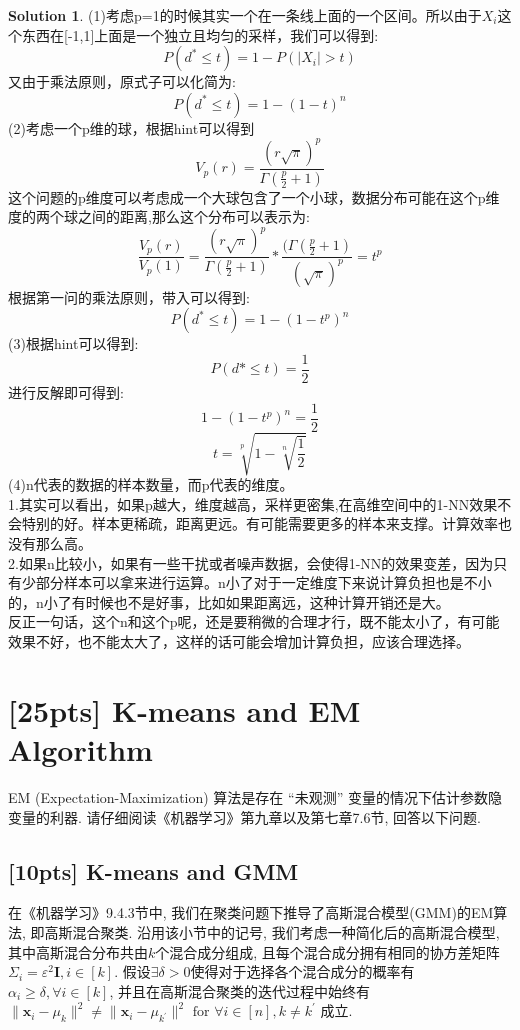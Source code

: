 \documentclass[a4paper,UTF8]{article}
\numberwithin{equation}{section}
\theoremstyle{definition}
\newtheorem*{solution}{Solution}
\def \x {\boldsymbol{x}}
\begin{document}
\begin{solution}
    (1)考虑p=1的时候其实一个在一条线上面的一个区间。所以由于$X_i$这个东西在[-1,1]上面是一个独立且均匀的采样，我们可以得到:\\
    \[  P(d^* \leq t) = 1 - P(|X_i| > t)\]
    又由于乘法原则，原式子可以化简为:\\
    \[  P(d^* \leq t) = 1 - (1 - t)^n\]
    (2)考虑一个p维的球，根据hint可以得到\\
    \[  V_p(r) = \frac{(r\sqrt\pi)^p}{\Gamma(\frac{p}{2} + 1)}\]
    这个问题的p维度可以考虑成一个大球包含了一个小球，数据分布可能在这个p维度的两个球之间的距离,那么这个分布可以表示为:\\
    \[  \frac{V_p(r)}{V_p(1)} = \frac{(r\sqrt\pi)^p}{\Gamma(\frac{p}{2} + 1)} *\frac{(\Gamma(\frac{p}{2} + 1)}{(\sqrt\pi)^p} = t^p\]
    根据第一问的乘法原则，带入可以得到:\\
    \[  P(d^* \leq t) = 1 - (1 - t^p)^n\]
    (3)根据hint可以得到:\\
    \[  P(d* \leq t) = \frac{1}{2}\]
    进行反解即可得到:\\
    \[  1 - (1 - t^p)^n = \frac{1}{2}\]
    \[  t = \sqrt[p]{1 - \sqrt[n]{\frac{1}{2}}}\]
    (4)n代表的数据的样本数量，而p代表的维度。\\
    1.其实可以看出，如果p越大，维度越高，采样更密集,在高维空间中的1-NN效果不会特别的好。样本更稀疏，距离更远。有可能需要更多的样本来支撑。计算效率也没有那么高。\\
    2.如果n比较小，如果有一些干扰或者噪声数据，会使得1-NN的效果变差，因为只有少部分样本可以拿来进行运算。n小了对于一定维度下来说计算负担也是不小的，n小了有时候也不是好事，比如如果距离远，这种计算开销还是大。\\
    反正一句话，这个n和这个p呢，还是要稍微的合理才行，既不能太小了，有可能效果不好，也不能太大了，这样的话可能会增加计算负担，应该合理选择。
\end{solution}

\newpage

\section{[25pts] K-means and EM Algorithm}
EM (Expectation-Maximization) 算法是存在 “未观测” 变量的情况下估计参数隐变量的利器. 
请仔细阅读《机器学习》第九章以及第七章7.6节, 回答以下问题.

\subsection{[10pts] K-means and GMM}
在《机器学习》9.4.3节中, 我们在聚类问题下推导了高斯混合模型(GMM)的EM算法, 即高斯混合聚类. 沿用该小节中的记号, 我们考虑一种简化后的高斯混合模型, 
其中高斯混合分布共由$k$个混合成分组成, 且每个混合成分拥有相同的协方差矩阵$\Sigma_i = \varepsilon^2 \mathbf{I}, i \in [k]$.
假设$\exists \delta > 0$使得对于选择各个混合成分的概率有$\alpha_i \geq \delta, \forall i \in [k]$, 并且在高斯混合聚类的迭代过程中始终有
$\|\x_i - \mu_k\|^2 \neq \|\x_i - \mu_{k^\prime}\|^2 \text{ for } \forall i \in [n], k \neq k^\prime$ 成立.
\end{document}
